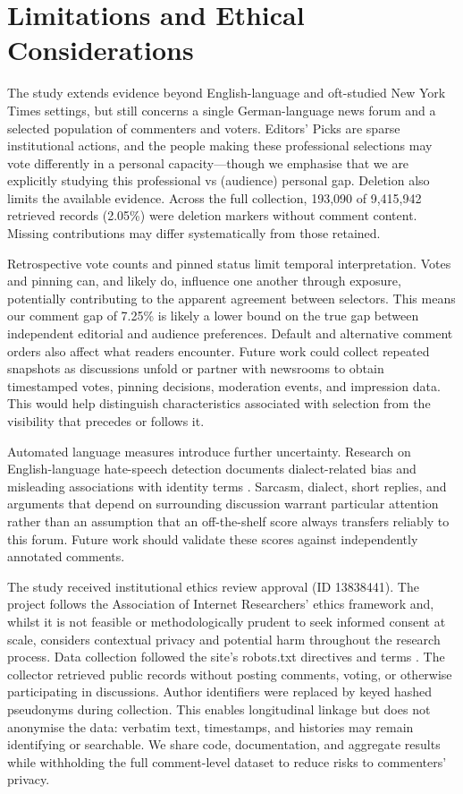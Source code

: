 \section{Limitations and Ethical Considerations}
\label{sec:ethics}
The study extends evidence beyond English-language and oft-studied New York Times settings, but still concerns a single German-language news forum and a selected population of commenters and voters. Editors' Picks are sparse institutional actions, and the people making these professional selections may vote differently in a personal capacity---though we emphasise that we are explicitly studying this professional vs (audience) personal gap. Deletion also limits the available evidence. Across the full collection, 193,090 of 9,415,942 retrieved records (2.05\%) were deletion markers without comment content. Missing contributions may differ systematically from those retained.

Retrospective vote counts and pinned status limit temporal interpretation. Votes and pinning can, and likely do, influence one another through exposure, potentially contributing to the apparent agreement between selectors. This means our comment gap of 7.25\% is likely a lower bound on the true gap between independent editorial and audience preferences. Default and alternative comment orders also affect what readers encounter. Future work could collect repeated snapshots as discussions unfold or partner with newsrooms to obtain timestamped votes, pinning decisions, moderation events, and impression data. This would help distinguish characteristics associated with selection from the visibility that precedes or follows it.

Automated language measures introduce further uncertainty. Research on English-language hate-speech detection documents dialect-related bias \citep{Sap2019} and misleading associations with identity terms \citep{Kennedy2020}. Sarcasm, dialect, short replies, and arguments that depend on surrounding discussion warrant particular attention rather than an assumption that an off-the-shelf score always transfers reliably to this forum. Future work should validate these scores against independently annotated comments.

The study received institutional ethics review approval (ID 13838441). The project follows the Association of Internet Researchers' ethics framework \citep{AoIR2019} and, whilst it is not feasible or methodologically prudent to seek informed consent at scale, considers contextual privacy and potential harm throughout the research process. Data collection followed the site's robots.txt directives and terms \citep{DerStandard2024, DerStandardRobots2026}. The collector retrieved public records without posting comments, voting, or otherwise participating in discussions. Author identifiers were replaced by keyed hashed pseudonyms during collection. This enables longitudinal linkage but does not anonymise the data: verbatim text, timestamps, and histories may remain identifying or searchable. We share code, documentation, and aggregate results while withholding the full comment-level dataset to reduce risks to commenters' privacy.

